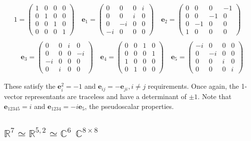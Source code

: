 \documentclass[a4paper]{book}
\numberwithin{equation}{chapter}
\begin{document}
\begin{align*}
1 =
\begin{pmatrix}
  1&  0&  0&0 \\
  0&  1&  0&0 \\
  0&  0&  1&0 \\
  0&  0&  0&1
\end{pmatrix}
\quad
\mathbf{e}_1=
\begin{pmatrix}
  0&  0&  0&i \\
  0&  0&  i&0 \\
  0&  -i&  0&0 \\
  -i&  0&  0&0
\end{pmatrix}
\quad
\mathbf{e}_2=
\begin{pmatrix}
  0&  0&  0&-1 \\
  0&  0&  -1&0 \\
  0&  -1&  0&0 \\
  1&  0&  0&0
\end{pmatrix} \\
\\
\quad
\mathbf{e}_3=
\begin{pmatrix}
  0&  0&  i&0 \\
  0&  0&  0&-i \\
  -i&  0&  0&0 \\
  0&  i&  0&0
\end{pmatrix}
\quad
\mathbf{e}_4=
\begin{pmatrix}
  0&  0&  1&0 \\
  0&  0&  0&1 \\
  1&  0&  0&0 \\
  0&  1&  0&0
\end{pmatrix}
\quad
\mathbf{e}_5=
\begin{pmatrix}
  -i&  0&  0&0 \\
  0&  -i&  0&0 \\
  0&  0&  i&0 \\
  0&  0&  0&i
\end{pmatrix}
\end{align*}

These satisfy the $\mathbf{e}_i^2=-1$ and $\mathbf{e}_{ij}=-\mathbf{e}_{ji},
i\neq j$
requirements. Once again, the 1-vector representants are traceless and have
a determinant of $\pm1$. Note that $\mathbf{e}_{12345}=i$ and 
$\mathbf{e}_{1234}=-i\mathbf{e}_5$, the pseudoscalar properties.

\vspace{\baselineskip}


    
    \subsection{$\mathbb{R}^{7}\simeq\mathbb{R}^{5,2}\simeq\mathbb{C}^{6} $ $\mathbb{C}^{8 \times 8}$}
\end{document}

